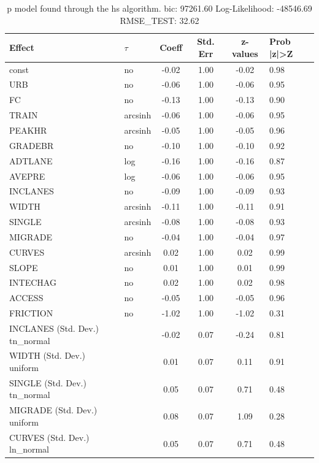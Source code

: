 \begin{table}
	\caption{p model found through the hs algorithm. bic: 97261.60 Log-Likelihood: -48546.69 RMSE_TEST: 32.62}
	\begin{center}
		\begin{tabular}{|l|l|c|c|c|l|}
			\hline
			Effect & $\tau$ & Coeff & Std. Err & z-values & Prob |z|>Z \\
			\hline
			const & no & -0.02 & 1.00 & -0.02 & 0.98 \\
			\hline
			URB & no & -0.06 & 1.00 & -0.06 & 0.95 \\
			\hline
			FC & no & -0.13 & 1.00 & -0.13 & 0.90 \\
			\hline
			TRAIN & arcsinh & -0.06 & 1.00 & -0.06 & 0.95 \\
			\hline
			PEAKHR & arcsinh & -0.05 & 1.00 & -0.05 & 0.96 \\
			\hline
			GRADEBR & no & -0.10 & 1.00 & -0.10 & 0.92 \\
			\hline
			ADTLANE & log & -0.16 & 1.00 & -0.16 & 0.87 \\
			\hline
			AVEPRE & log & -0.06 & 1.00 & -0.06 & 0.95 \\
			\hline
			INCLANES & no & -0.09 & 1.00 & -0.09 & 0.93 \\
			\hline
			WIDTH & arcsinh & -0.11 & 1.00 & -0.11 & 0.91 \\
			\hline
			SINGLE & arcsinh & -0.08 & 1.00 & -0.08 & 0.93 \\
			\hline
			MIGRADE & no & -0.04 & 1.00 & -0.04 & 0.97 \\
			\hline
			CURVES & arcsinh & 0.02 & 1.00 & 0.02 & 0.99 \\
			\hline
			SLOPE & no & 0.01 & 1.00 & 0.01 & 0.99 \\
			\hline
			INTECHAG & no & 0.02 & 1.00 & 0.02 & 0.98 \\
			\hline
			ACCESS & no & -0.05 & 1.00 & -0.05 & 0.96 \\
			\hline
			FRICTION & no & -1.02 & 1.00 & -1.02 & 0.31 \\
			\hline
			INCLANES (Std. Dev.) tn_normal &  & -0.02 & 0.07 & -0.24 & 0.81 \\
			\hline
			WIDTH (Std. Dev.) uniform &  & 0.01 & 0.07 & 0.11 & 0.91 \\
			\hline
			SINGLE (Std. Dev.) tn_normal &  & 0.05 & 0.07 & 0.71 & 0.48 \\
			\hline
			MIGRADE (Std. Dev.) uniform &  & 0.08 & 0.07 & 1.09 & 0.28 \\
			\hline
			CURVES (Std. Dev.) ln_normal &  & 0.05 & 0.07 & 0.71 & 0.48 \\

\end{tabular}
\end{center}
\end{table}

